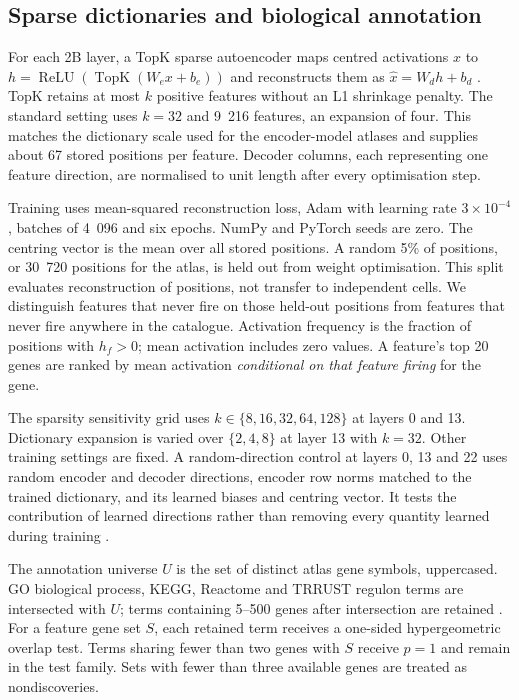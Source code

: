 \documentclass[review,authoryear,12pt]{elsarticle}
\begin{document}
\subsection{Sparse dictionaries and biological annotation}

For each 2B layer, a TopK sparse autoencoder maps centred activations $x$ to
$h=\operatorname{ReLU}(\operatorname{TopK}(W_ex+b_e))$ and reconstructs them as
$\hat x=W_dh+b_d$ \citep{ref20}. TopK retains at most $k$ positive features without an L1
shrinkage penalty. The standard setting uses $k=32$ and 9~216 features, an expansion of four.
This matches the dictionary scale used for the encoder-model atlases \citep{ref6,ref7} and supplies
about 67 stored positions per feature. Decoder columns, each representing one feature direction,
are normalised to unit length after every optimisation step.

Training uses mean-squared reconstruction loss, Adam with learning rate $3\times10^{-4}$,
batches of 4~096 and six epochs. NumPy and PyTorch seeds are zero. The centring vector is the
mean over all stored positions. A random 5\% of positions, or 30~720 positions for the atlas,
is held out from weight optimisation. This split evaluates reconstruction of positions, not
transfer to independent cells. We distinguish features that never fire on those held-out positions
from features that never fire anywhere in the catalogue. Activation frequency is the fraction of
positions with $h_f>0$; mean activation includes zero values. A feature's top 20 genes are ranked
by mean activation \emph{conditional on that feature firing} for the gene.

The sparsity sensitivity grid uses $k\in\{8,16,32,64,128\}$ at layers 0 and 13.
Dictionary expansion is varied over $\{2,4,8\}$ at layer 13 with $k=32$. Other training settings
are fixed. A random-direction control at layers 0, 13 and 22 uses random encoder and decoder
directions, encoder row norms matched to the trained dictionary, and its learned biases and
centring vector. It tests the contribution of learned directions rather than removing every
quantity learned during training \citep{refRandomSAEBaselines}.

The annotation universe $U$ is the set of distinct atlas gene symbols, uppercased. GO biological
process, KEGG, Reactome and TRRUST regulon terms are intersected with $U$; terms containing
5--500 genes after intersection are retained \citep{ref41,ref42,ref43,ref44,ref45,ref47}.
For a feature gene set $S$, each retained term receives a one-sided hypergeometric overlap test.
Terms sharing fewer than two genes with $S$ receive $p=1$ and remain in the test family.
Sets with fewer than three available genes are treated as nondiscoveries.
\end{document}
